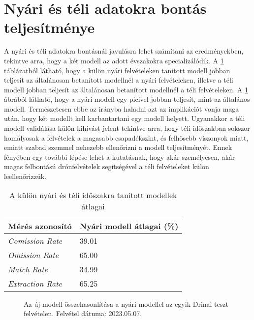 \section{Nyári és téli adatokra bontás teljesítménye}
\label{ch:summer-winter-models}

A nyári és téli adatokra bontásnál javulásra lehet számítani az eredményekben, tekintve arra, hogy a két modell az adott évszakokra specializálódik. A \ref{tab:summer-winter-split} táblázatból  látható, hogy a külön nyári felvételeken tanított modell jobban teljesít az általánosan betanított modellnél a nyári felvételeken, illetve a téli modell jobban teljesít az általánosan betanított modellnél a téli felvételeken. A \ref{fig:summer-vs-new} ábrából látható, hogy a nyári modell egy picivel jobban teljesít, mint az általános modell. Természetesen ebbe az irányba haladni azt az implikációt vonja maga után, hogy két modellt kell karbantartani egy modell helyett. Ugyanakkor a téli modell validálása külön kihívást jelent tekintve arra, hogy téli időszakban sokszor homályosak a felvételek a magasabb csapadékszint, és felhősebb viszonyok miatt, emiatt szabad szemmel nehezebb ellenőrizni a modell teljesítményét. Ennek fényében egy további lépése lehet a kutatásnak, hogy akár személyesen, akár magas felbontású drónfelvételek segítségével a téli felvételeket külön leellenőrizzük. 

\begin{table}[H]
	\centering
	\begin{tabular}{ | p{} | p{} | }
		\hline
		\textbf{Mérés azonosító} & \textbf{Nyári modell átlagai (\%)} \\
		\hline \hline
		\emph{Comission Rate} & 39.01 \\
		\hline
		\emph{Omission Rate} & 65.00  \\
		\hline
		\emph{Match Rate} & 34.99  \\
		\hline
        \emph{Extraction Rate} & 65.25 \\
		\hline
	\end{tabular}
	\caption{A külön nyári és téli időszakra tanított modellek átlagai}
	\label{tab:summer-winter-split}
\end{table}

\begin{figure}[H]
	\centering
	\hspace{5pt}
	\hspace{5pt}
	\caption{Az új modell összehasonlítása a nyári modellel az egyik Drinai teszt felvételen. Felvétel dátuma: 2023.05.07.}
	\label{fig:summer-vs-new}
\end{figure}

